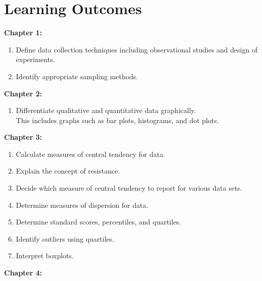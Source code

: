 \documentclass{report}
\begin{document}
    \section{Learning Outcomes}
    \bigbreak \noindent 
    \textbf{Chapter 1:}
    \begin{enumerate}
        \item Define data collection techniques including observational studies and design of experiments.
        \item Identify appropriate sampling methods.
    \end{enumerate}
    \bigbreak \noindent 
    \textbf{Chapter 2:}
    \begin{enumerate}
        \item Differentiate qualitative and quantitative data graphically. \\ This includes graphs such as bar plots, histograms, and dot plots.
    \end{enumerate}
    \bigbreak \noindent 
    \textbf{Chapter 3:}
    \begin{enumerate}
        \item Calculate measures of central tendency for data.
        \item Explain the concept of resistance.
        \item Decide which measure of central tendency to report for various data sets.
        \item Determine measures of dispersion for data.
        \item Determine standard scores, percentiles, and quartiles.
        \item Identify outliers using quartiles.
        \item Interpret boxplots.
    \end{enumerate}
    \bigbreak \noindent 
    \textbf{Chapter 4:}
\end{document}
